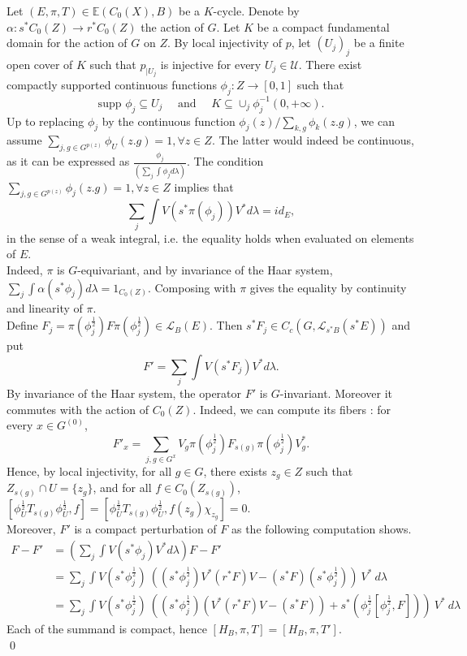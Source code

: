 \begin{dem}
Let $(E,\pi,T)\in \mathbb E(C_0(X),B)$ be a $K$-cycle. Denote by $\alpha : s^* C_0(Z) \rightarrow r^*C_0(Z)$ the action of $G$. Let $K$ be a compact fundamental domain for the action of $G$ on $Z$. By local injectivity of $p$, let $(U_j)_j$ be a finite open cover of $K$ such that $p_{|U_j}$ is injective for every $U_j\in \mathcal U$. There exist compactly supported continuous functions $\phi_j : Z\rightarrow [0,1]$ such that  \[\text{supp }\phi_j \subseteq U_j \quad\text{ and }\quad K\subseteq \cup_{j} \phi_j^{-1}(0,+\infty).\]
Up to replacing $\phi_j$ by the continuous function $\phi_j(z) / \sum_{k,g} \phi_k(z.g)$, we can assume $\sum_{j,g\in G^{p(z)}} \phi_U (z.g) = 1,\forall z\in Z$. The latter would indeed be continuous, as it can be expressed as $\frac{\phi_j} {(\sum_j\int \phi_j d\lambda ) }$. The condition $\sum_{j,g\in G^{p(z)}} \phi_j (z.g) = 1,\forall z\in Z$ implies that 
\[\sum_j \int V(s^*\pi(\phi_j))V^*d\lambda = id_E ,\]
in the sense of a weak integral, i.e. the equality holds when evaluated on elements of $E$.\\
  
Indeed, $\pi$ is $G$-equivariant, and by invariance of the Haar system, $\sum_j\int \alpha(s^*\phi_j)d\lambda = 1_{C_0(Z)}$. Composing with $\pi$ gives the equality by continuity and linearity of $\pi$.\\  

Define $F_j = \pi(\phi_j^\frac{1}{2}) F \pi(\phi_j^\frac{1}{2})\in\mathcal L_B(E)$. Then $s^* F_j\in C_c(G,\mathcal L_{s^* B}(s^* E))$ and put
\[F'= \sum_{j} \int V (s^*F_j) V^* d\lambda.\] 
By invariance of the Haar system, the operator $F'$ is  $G$-invariant. Moreover it commutes with the action of $C_0(Z)$. Indeed, we can compute its fibers : for every $x\in G^{(0)}$,
\[F'_x = \sum_{j, g\in G^x} V_g\pi(\phi_j^{\frac{1}{2}}) F_{s(g)}\pi(\phi_j^{\frac{1}{2}})V_g^*.\] 
Hence, by local injectivity, for all $g\in G$, there exists $z_g\in Z$ such that $Z_{s(g)}\cap U = \{z_g\}$, and for all $f\in C_0(Z_{s(g)})$, $[ \phi_U^{\frac{1}{2}} T_{s(g)} \phi_U^{\frac{1}{2}},f ] = [ \phi_U^{\frac{1}{2}} T_{s(g)} \phi_U^{\frac{1}{2}},f(z_g) \chi_{z_g} ]=0 $.\\

Moreover, $F'$ is a compact perturbation of $F$ as the following computation shows.\\
\[\begin{array}{rl}
F -F' 	& = (\sum_{j} \int V (s^* \phi_j) V^*d\lambda)F -F' \\
		& = \sum_{j}\int V (s^*\phi_j^{\frac{1}{2}}) \ 
\left( (s^*\phi_j^\frac{1}{2}) V^* (r^*F) V- (s^*F)(s^*\phi_j^\frac{1}{2}) \right) \ V^* \ d\lambda\\
		& = \sum_{j} \int V (s^*\phi_j^{\frac{1}{2}}) \ 
			\left( (s^*\phi_j^\frac{1}{2}) (V^* (r^*F)V - (s^*F)) + s^*(\phi_j^\frac{1}{2} [\phi_j^\frac{1}{2},F] )\right) \ 
				V^* \ d\lambda	  	
\end{array}\]
Each of the summand is compact, hence $[H_B, \pi,T]=[H_B,\pi,T']$.\\ 
\qed
\end{dem}

